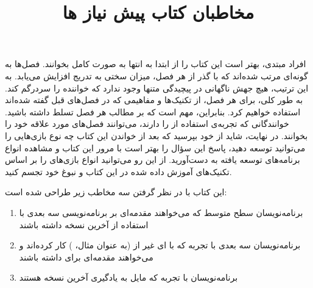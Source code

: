 {
    \Large
    \begin{spacing}{1.5}
        افراد مبتدی، بهتر است این کتاب را از ابتدا به انتها به صورت کامل بخوانند. فصل‌ها به گونه‌ای مرتب شده‌اند که با گذر از هر فصل، میزان سختی به تدریج افزایش می‌یابد. به این ترتیب، هیچ جهش ناگهانی در پیچیدگی متنها وجود ندارد که خواننده را سردرگم کند.
        به طور کلی، برای هر فصل، از تکنیک‌ها و مفاهیمی که در فصل‌های قبل گفته شده‌اند استفاده خواهیم کرد. بنابراین، مهم است که بر مطالب هر فصل تسلط داشته باشید.
        خوانندگانی که تجربه‌ی استفاده از  را دارند، می‌توانند فصل‌های مورد علاقه خود را بخوانند. در نهایت، شاید از خود بپرسید که بعد از خواندن این کتاب چه نوع بازی‌هایی را می‌توانید توسعه دهید، پاسخ این سؤال را بهتر است با مرور این کتاب و مشاهده انواع برنامه‌های توسعه یافته به دست‌آورید.
        از این رو می‌توانید انواع بازی‌های را بر اساس تکنیک‌های آموزش داده شده در این کتاب و نبوغ خود تجسم کنید.
    \end{spacing}
}

\newpage

\title{
    \huge
    \hspace{-40pt}
    \textbf{مخاطبان کتاب}
}  \rullFillWithLine[0.5em]{1pt}
\textbf{\vspace{7pt}}

{
    \Large
    \begin{spacing}{1.5}
        این کتاب با در نظر گرفتن سه مخاطب زیر طراحی شده است:
        \begin{enumerate}[label=\textbf{\arabic*}.]
            \item {برنامه‌نویسان سطح متوسط  که می‌خواهند مقدمه‌ای بر برنامه‌نویسی سه بعدی با استفاده از آخرین نسخه  داشته باشند}
            \item {برنامه‌نویسان سه بعدی با تجربه که با ‌ای غیر از  (به عنوان مثال، ) کار کرده‌اند و می‌خواهند مقدمه‌ای برای  داشته باشند}
            \item {برنامه‌نویسان با تجربه  که مایل به یادگیری آخرین نسخه  هستند}
        \end{enumerate}
    \end{spacing}
}
\textbf{\vspace{10pt}}

\title{
    \huge
    \hspace{-40pt}
    \textbf{پیش نیاز ها}
}  \rullFillWithLine[0.5em]{1pt}
\textbf{\vspace{7pt}}

